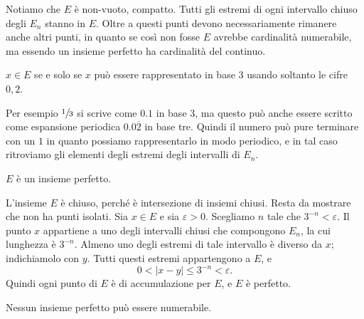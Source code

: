 \documentclass[a4paper]{article}
\begin{document}
\begin{radioactive}
Notiamo che \(E\) è non-vuoto, compatto.
Tutti gli estremi di ogni intervallo chiuso degli \(E_n\)
stanno in \(E\). Oltre a questi punti devono necessariamente rimanere
anche altri punti, in quanto se così non fosse \(E\) avrebbe cardinalità numerabile,
ma essendo un insieme perfetto ha cardinalità del continuo.
\end{radioactive}

\begin{radioactive}
\begin{snippetproposition}{}
    \(x \in E\) se e solo se \(x\)
    può essere rappresentato in base 3 usando soltanto
    le cifre \(0,2\).
\end{snippetproposition}
\end{radioactive}

\begin{radioactive}
Per esempio \(\sfrac13\) si scrive come \(0.1\) in base \(3\),
ma questo può anche essere scritto come espansione periodica \(0.0\overline 2\) in base tre.
Quindi il numero può pure terminare con un \(1\) in quanto possiamo rappresentarlo
in modo periodico, e in tal caso ritroviamo gli elementi degli estremi degli intervalli
di \(E_n\).
\end{radioactive}

\begin{radioactive}
\begin{snippetproposition}{}
    \(E\) è un insieme perfetto.
\end{snippetproposition}
\end{radioactive}

\begin{radioactive}
\begin{snippetproof}{}
    L'insieme \(E\) è chiuso, perché è intersezione di insiemi chiusi. Resta da
    mostrare che non ha punti isolati. Sia \(x\in E\) e sia \(\varepsilon>0\).
    Scegliamo \(n\) tale che \(3^{-n}<\varepsilon\). Il punto \(x\) appartiene a uno
    degli intervalli chiusi che compongono \(E_n\), la cui lunghezza è \(3^{-n}\).
    Almeno uno degli estremi di tale intervallo è diverso da \(x\); indichiamolo con
    \(y\). Tutti questi estremi appartengono a \(E\), e
    \[
        0<|x-y|\leq3^{-n}<\varepsilon.
    \]
    Quindi ogni punto di \(E\) è di accumulazione per \(E\), e \(E\) è perfetto.
\end{snippetproof}
\end{radioactive}

\begin{radioactive}
\begin{snippetproposition}{}
    Nessun insieme perfetto può essere numerabile.
\end{snippetproposition}
\end{radioactive}
\end{document}
